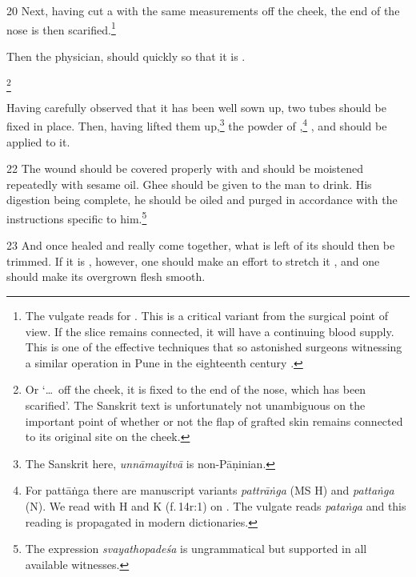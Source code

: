 \begin{translation}
    \item[20] Next, having cut a  with the same
    measurements off the cheek, the end of the nose is then scarified.\footnote{The
    vulgate reads  for .
    This is a critical variant from the surgical point of view.  If the slice remains
    connected, it will have a continuing blood supply.  This is one of the effective 
    techniques that so astonished surgeons witnessing a similar operation in Pune in
    the eighteenth century \citep[see][67--70]{wuja-roots3}.}
    
    Then the  physician, 
    should quickly  so that it is 
    .
    
    
    \footnote{Or
    `\ldots\ off the cheek, it is fixed to the end of the nose, which has been
    scarified'. The Sanskrit text is unfortunately not unambiguous on the
    important point of whether or not the flap of grafted skin remains connected
    to its original site on the cheek.} 
    
    Having carefully observed that it has been well sown up,
    two tubes should be fixed in place.  Then, having lifted them up,\footnote{The 
    Sanskrit here, \emph{unnāmayitvā} is  non-Pāṇinian.}
    the powder of
    ,\footnote{For {pattāṅga} there are manuscript variants 
    \emph{pattrāṅga} (MS H) and \emph{pattaṅga}    (N).  We read with H and K 
    (f.\,14r:1) on \citet[1.14.36]{vulgate}. The vulgate reads \emph{pataṅga} 
    and this reading is propagated in modern dictionaries.}
    ,
    and
    should be applied to it.
    
    \item[22] 
    The wound should be covered properly with  and should be
    moistened repeatedly with sesame oil.  Ghee should be given to the man to
    drink.  His digestion being complete, he should be oiled and purged in
    accordance with the instructions specific to him.\footnote{The expression 
    \emph{svayathopadeśa} is ungrammatical but supported in all available 
    witnesses.}   
    
    \item[23] %
    And once healed and really come together, what is left of its 
    should then be trimmed. If it is  , however, one should make an
    effort to stretch it , and one should make its overgrown flesh smooth.
    
    
\end{translation}    
